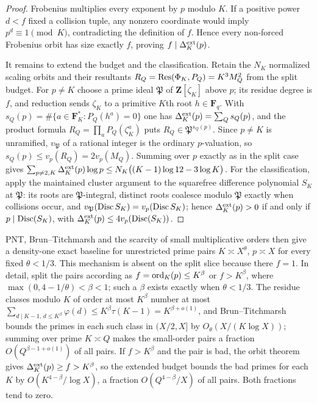 \begin{proof}
Frobenius multiplies every exponent by $p$ modulo $K$.  If a positive power
$d<f$ fixed a collision tuple, any nonzero coordinate would imply
$p^d\equiv1\pmod K$, contradicting the definition of $f$.  Hence every
non-forced Frobenius orbit has size exactly $f$, proving
$f\mid\Delta_K^{\rm ext}(p)$.

It remains to extend the budget and the classification.  Retain the
$N_K$ normalized scaling orbits and their resultants
$R_Q=\operatorname{Res}(\Phi_K,P_Q)=K^3M_Q^2$ from the split budget.  For $p\ne K$
choose a prime ideal $\mathfrak P$ of $\mathbf Z[\zeta_K]$ above
$p$; its residue degree is $f$, and reduction sends $\zeta_K$ to a
primitive $K$th root $h\in\mathbf F_q$.  With
$s_Q(p)=\#\{a\in\mathbf F_K^\ast:P_Q(h^a)=0\}$ one has
$\Delta_K^{\rm ext}(p)=\sum_Qs_Q(p)$, and the product formula
$R_Q=\prod_aP_Q(\zeta_K^a)$ puts $R_Q\in\mathfrak P^{s_Q(p)}$.
Since $p\ne K$ is unramified, $v_{\mathfrak P}$ of a rational
integer is the ordinary $p$-valuation, so
$s_Q(p)\le v_p(R_Q)=2v_p(M_Q)$.  Summing over $p$ exactly as in the
split case gives
$\sum_{p\ne2,K}\Delta_K^{\rm ext}(p)\log p
 \le N_K\bigl((K-1)\log12-3\log K\bigr)$.
For the classification, apply the maintained cluster argument to
the squarefree difference polynomial $S_K$ at $\mathfrak P$: its
roots are $\mathfrak P$-integral, distinct roots coalesce modulo
$\mathfrak P$ exactly when collisions occur, and
$v_{\mathfrak P}(\operatorname{Disc} S_K)=v_p(\operatorname{Disc} S_K)$; hence
$\Delta_K^{\rm ext}(p)>0$ if and only if $p\mid\operatorname{Disc}(S_K)$, with
$\Delta_K^{\rm ext}(p)\le4v_p(\operatorname{Disc}(S_K))$.
\end{proof}

PNT, Brun--Titchmarsh and the scarcity of small multiplicative orders then give
a density-one exact baseline for unrestricted prime pairs
$K\asymp X^\theta$, $p\asymp X$ for every fixed $\theta<1/3$.  This mechanism
is absent on the split slice because there $f=1$.  In detail, split
the pairs according as $f=\operatorname{ord}_K(p)\le K^\beta$ or $f>K^\beta$,
where $\max(0,4-1/\theta)<\beta<1$; such a $\beta$ exists exactly
when $\theta<1/3$.  The residue classes modulo $K$ of order at
most $K^\beta$ number at most
$\sum_{d\mid K-1,\,d\le K^\beta}\varphi(d)\le K^\beta\tau(K-1)
 =K^{\beta+o(1)}$,
and Brun--Titchmarsh bounds the primes in each such class in
$(X/2,X]$ by $O_\theta(X/(K\log X))$; summing over prime
$K\asymp Q$ makes the small-order pairs a fraction
$O(Q^{\beta-1+o(1)})$ of all pairs.  If $f>K^\beta$ and the pair is
bad, the orbit theorem gives
$\Delta_K^{\rm ext}(p)\ge f>K^\beta$, so the extended budget bounds
the bad primes for each $K$ by $O(K^{4-\beta}/\log X)$, a fraction
$O(Q^{4-\beta}/X)$ of all pairs.  Both fractions tend to zero.

